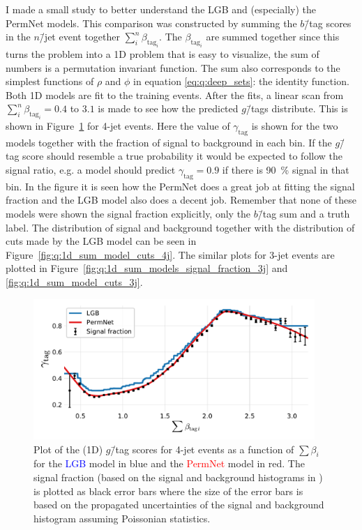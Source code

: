 I made a small study to better understand the LGB and (especially) the PermNet models. This comparison was constructed by summing the $b$\=/tag scores in the $n$\=/jet event together $\sum_i^n \beta_{\mathrm{tag}_i}$. The $\beta_{\mathrm{tag}_i}$ are summed together since this turns the problem into a \num{1}D problem that is easy to visualize, the sum of numbers is a permutation invariant function. The sum also corresponds to the simplest functions of $\rho$ and $\phi$ in equation \eqref{eq:q:deep_sets}: the identity function. Both 1D models are fit to the training events. After the fits, a linear scan from $\sum_i^n \beta_{\mathrm{tag}_i}=0.4$ to $3.1$ is made to see how the predicted $g$\=/tags distribute. This is shown in Figure~\ref{fig:q:1d_sum_models_signal_fraction_4j} for 4-jet events. Here the value of $\gamma_\mathrm{tag}$ is shown for the two models together with the fraction of signal to background in each bin. If the $g$\=/tag score should resemble a true probability it would be expected to follow the signal ratio, e.g. a model should predict $\gamma_\mathrm{tag}=0.9$ if there is \SI{90}{\percent} signal in that bin. In the figure it is seen how the PermNet does a great job at fitting the signal fraction and the LGB model also does a decent job. Remember that none of these models were shown the signal fraction explicitly, only the $b$\=/tag sum and a truth label. The distribution of signal and background together with the distribution of cuts made by the LGB model can be seen in Figure~\ref{fig:q:1d_sum_model_cuts_4j}. The similar plots for 3-jet events are plotted in Figure~\ref{fig:q:1d_sum_models_signal_fraction_3j} and \ref{fig:q:1d_sum_model_cuts_3j}.

\begin{figure}
  \centerfloat
  \includegraphics[width=0.95\textwidth, trim=10 10 10 20, clip]{figures/quarks/gtag_sum_models_njet=4-down_sample=1.00-ML_vars=vertex-selection=b-ejet_min=4-n_iter_RS_lgb=99-n_iter_RS_xgb=9-cdot_cut=0.90-version=19.pdf}
  \caption[1D Sum Models Predictions and Signal Fraction for 4-jets events]
          {Plot of the (1D) $g$\=/tag scores for 4-jet events as a function of $\sum \beta_i$ for the \textcolor{blue}{LGB} model in blue and the \textcolor{red}{PermNet} model in red. The signal fraction (based on the signal and background histograms in ) is plotted as black error bars where the size of the error bars is based on the propagated uncertainties of the signal and background histogram assuming Poissonian statistics. } 
  \label{fig:q:1d_sum_models_signal_fraction_4j}
\end{figure}

